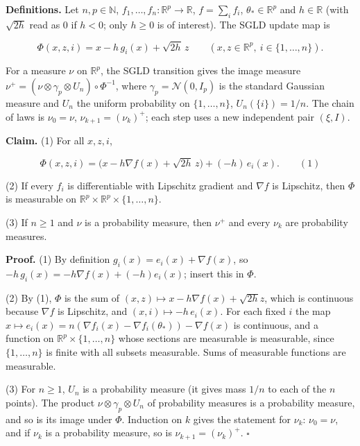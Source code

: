 \documentclass[11pt,a4paper]{article}
\begin{document}
\textbf{Definitions.} Let \(n,p\in\mathbb N\), \(f_1,\dots,f_n:\mathbb R^p\to\mathbb R\), \(f=\sum_if_i\), \(\theta_*\in\mathbb R^p\) and \(h\in\mathbb R\) (with \(\sqrt{2h}\) read as \(0\) if \(h<0\); only \(h\ge0\) is of interest). The SGLD update map is


\[\Phi(x,z,i)=x-h\,g_i(x)+\sqrt{2h}\,z\qquad(x,z\in\mathbb R^p,\ i\in\{1,\dots,n\}).\]


For a measure \(\nu\) on \(\mathbb R^p\), the SGLD transition gives the image measure \(\nu^+=(\nu\otimes\gamma_p\otimes U_n)\circ\Phi^{-1}\), where \(\gamma_p=\mathcal N(0,I_p)\) is the standard Gaussian measure and \(U_n\) the uniform probability on \(\{1,\dots,n\}\), \(U_n(\{i\})=1/n\). The chain of laws is \(\nu_0=\nu\), \(\nu_{k+1}=(\nu_k)^+\); each step uses a new independent pair \((\xi,I)\).




\textbf{Claim.} (1) For all \(x,z,i\),


\[\Phi(x,z,i)=\bigl(x-h\nabla f(x)+\sqrt{2h}\,z\bigr)+(-h)\,e_i(x).\qquad(1)\]


(2) If every \(f_i\) is differentiable with Lipschitz gradient and \(\nabla f\) is Lipschitz, then \(\Phi\) is measurable on \(\mathbb R^p\times\mathbb R^p\times\{1,\dots,n\}\).




(3) If \(n\ge1\) and \(\nu\) is a probability measure, then \(\nu^+\) and every \(\nu_k\) are probability measures.




\textbf{Proof.} (1) By definition \(g_i(x)=e_i(x)+\nabla f(x)\), so \(-h\,g_i(x)=-h\nabla f(x)+(-h)e_i(x)\); insert this in \(\Phi\).




(2) By (1), \(\Phi\) is the sum of \((x,z)\mapsto x-h\nabla f(x)+\sqrt{2h}z\), which is continuous because \(\nabla f\) is Lipschitz, and \((x,i)\mapsto-h\,e_i(x)\). For each fixed \(i\) the map \(x\mapsto e_i(x)=n(\nabla f_i(x)-\nabla f_i(\theta_*))-\nabla f(x)\) is continuous, and a function on \(\mathbb R^p\times\{1,\dots,n\}\) whose sections are measurable is measurable, since \(\{1,\dots,n\}\) is finite with all subsets measurable. Sums of measurable functions are measurable.




(3) For \(n\ge1\), \(U_n\) is a probability measure (it gives mass \(1/n\) to each of the \(n\) points). The product \(\nu\otimes\gamma_p\otimes U_n\) of probability measures is a probability measure, and so is its image under \(\Phi\). Induction on \(k\) gives the statement for \(\nu_k\): \(\nu_0=\nu\), and if \(\nu_k\) is a probability measure, so is \(\nu_{k+1}=(\nu_k)^+\). \(\square\)
\end{document}
